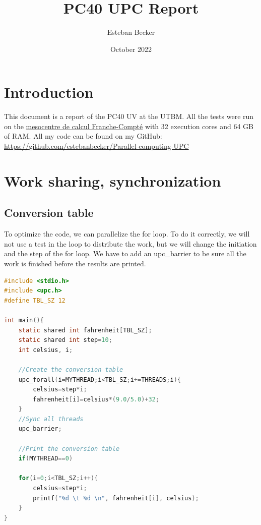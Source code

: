 \documentclass{report}
\title{PC40 UPC Report}
\author{Esteban Becker}
\date{October 2022}
\begin{document}
\maketitle

\tableofcontents

\chapter{Introduction}

This document is a report of the PC40 UV at the UTBM. \newline
All the tests were run on the \href{https://www.univ-fcomte.fr/informatique-calcul/mesocentre-de-calcul}{mesocentre de calcul Franche-Compté} with 32 execution cores and 64 GB of RAM.\newline
All my code can be found on my GitHub: \href{https://github.com/estebanbecker/Parallel-computing-UPC}{https://github.com/estebanbecker/Parallel-computing-UPC}

\chapter{Work sharing, synchronization}

\section{Conversion table}

To optimize the code, we can parallelize the for loop. To do it correctly, we will not use a test in the loop to distribute the work, but we will change the initiation and the step of the for loop.\newline
We have to add an upc\_barrier to be sure all the work is finished before the results are printed.

\begin{lstlisting}[language=C]
#include <stdio.h>
#include <upc.h>
#define TBL_SZ 12

int main(){
    static shared int fahrenheit[TBL_SZ];
    static shared int step=10; 
    int celsius, i;

    //Create the conversion table
    upc_forall(i=MYTHREAD;i<TBL_SZ;i+=THREADS;i){
        celsius=step*i;
        fahrenheit[i]=celsius*(9.0/5.0)+32;
    }
    //Sync all threads
    upc_barrier;

    //Print the conversion table
    if(MYTHREAD==0)

    for(i=0;i<TBL_SZ;i++){
        celsius=step*i;
        printf("%d \t %d \n", fahrenheit[i], celsius);
    }
}

\end{lstlisting}
\end{document}
